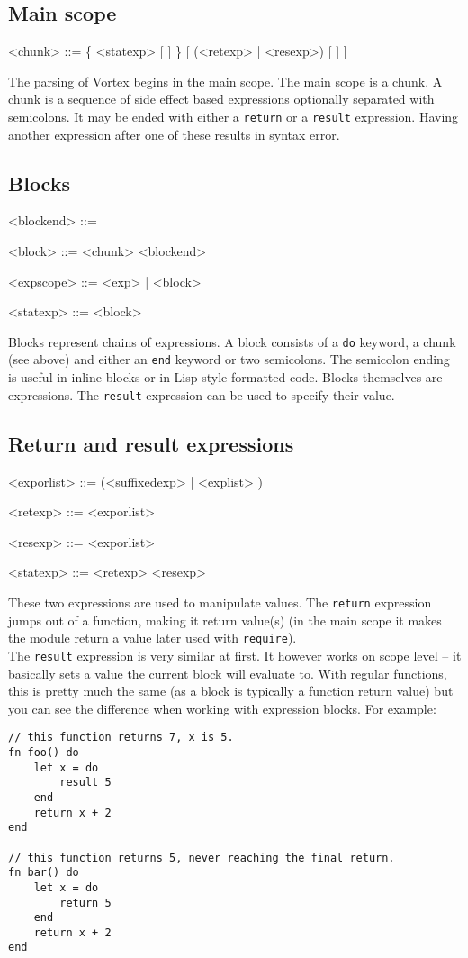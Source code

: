 \documentclass{article}
\newenvironment{bnf}
{
\begin{mdframed}
\begin{grammar}
}
{
\end{grammar}
\end{mdframed}
}
\begin{document}
\subsection{Main scope}
\begin{bnf}
<chunk> ::= \{ <statexp> [ \lit{;} ] \} [ (<retexp> | <resexp>) [ \lit{;} ] ]
\end{bnf}
The parsing of Vortex begins in the main scope. The main scope is a chunk.
A chunk is a sequence of side effect based expressions optionally separated
with semicolons. It may be ended with either a \verb|return| or a \verb|result|
expression. Having another expression after one of these results in syntax
error.
\subsection{Blocks}
\begin{bnf}
<blockend> ::=  | \lit{;;}

<block> ::=  <chunk> <blockend>

<expscope> ::= \lit{->} <exp> | <block>

<statexp> ::= <block>
\end{bnf}
Blocks represent chains of expressions. A block consists of a \verb|do|
keyword, a chunk (see above) and either an \verb|end| keyword or two
semicolons. The semicolon ending is useful in inline blocks or in
Lisp style formatted code. Blocks themselves are expressions. The \verb|result|
expression can be used to specify their value.
\subsection{Return and result expressions}
\begin{bnf}
<exporlist> ::= (<suffixedexp> | \lit{(} <explist> \lit{)})

<retexp> ::=  <exporlist>

<resexp> ::=  <exporlist>

<statexp> ::= <retexp> <resexp>
\end{bnf}
These two expressions are used to manipulate values. The \verb|return|
expression jumps out of a function, making it return value(s) (in the main
scope it makes the module return a value later used with \verb|require|).\\
The \verb|result| expression is very similar at first. It however works on
scope level -- it basically sets a value the current block will evaluate to.
With regular functions, this is pretty much the same (as a block is typically
a function return value) but you can see the difference when working with
expression blocks. For example:
\begin{lstlisting}[language=vortex]
// this function returns 7, x is 5.
fn foo() do
    let x = do
        result 5
    end
    return x + 2
end

// this function returns 5, never reaching the final return.
fn bar() do
    let x = do
        return 5
    end
    return x + 2
end
\end{lstlisting}
\end{document}
